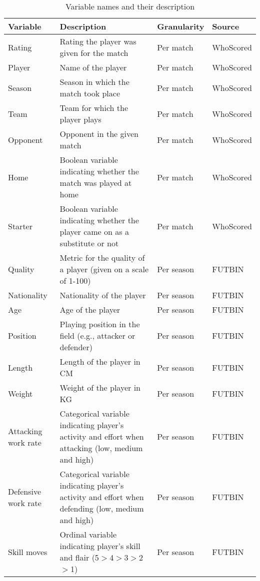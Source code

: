 \begin{table}[htbp]
    \begin{spacing}{1.5}
    \centering
    \small
    \caption{Variable names and their description}
    \label{tab:variable_names_description}%
    \begin{tabularx}{\textwidth}{p{3cm}Xp{2cm}p{3cm}}
        \toprule
        \toprule
        \textbf{Variable} & \textbf{Description} & \textbf{Granularity} & \textbf{Source} \\
        \midrule
        Rating & Rating the player was given for the match & Per match & WhoScored \\
        Player & Name of the player & Per match & WhoScored \\
        Season & Season in which the match took place & Per match & WhoScored \\
        Team  & Team for which the player plays & Per match & WhoScored \\
        Opponent & Opponent in the given match & Per match & WhoScored \\
        Home  & Boolean variable indicating whether the match was played at home & Per match & WhoScored \\
        Starter & Boolean variable indicating whether the player came on as a substitute or not & Per match & WhoScored \\
        Quality & Metric for the quality of a player (given on a scale of 1-100) & Per season & FUTBIN \\
        Nationality & Nationality of the player & Per season & FUTBIN \\
        Age   & Age of the player & Per season & FUTBIN \\
        Position & Playing position in the field (e.g., attacker or defender) & Per season & FUTBIN \\
        Length & Length of the player in CM & Per season & FUTBIN \\
        Weight & Weight of the player in KG & Per season & FUTBIN \\
        Attacking work rate & Categorical variable indicating player's activity and effort when attacking (low, medium and high) & Per season & FUTBIN \\
        Defensive work rate & Categorical variable indicating player's activity and effort when defending (low, medium and high) & Per season & FUTBIN \\
        Skill moves & Ordinal variable indicating player's skill and flair (5$>$4$>$3$>$2$>$1) & Per season & FUTBIN \\

\end{tabularx}
\end{spacing}
\end{table}

